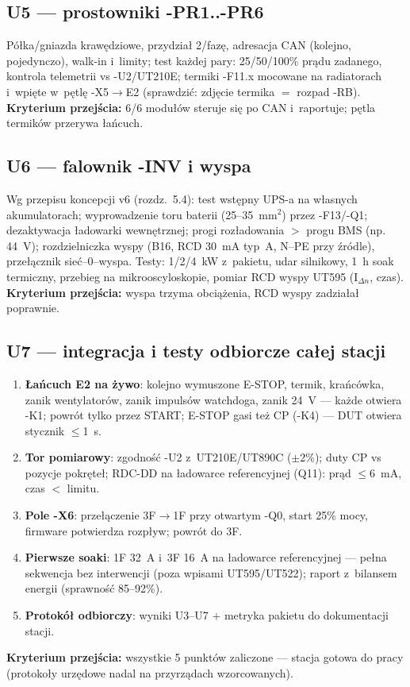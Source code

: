 \documentclass[11pt,a4paper]{article}
\newcommand{\krok}[1]{\textbf{\color{granat}Kryterium przejścia:} #1}
\begin{document}
\subsection{U5 --- prostowniki -PR1..-PR6}
Półka/gniazda krawędziowe, przydział 2/fazę, adresacja CAN (kolejno, pojedynczo), walk-in i~limity; test
każdej pary: 25/50/100\% prądu zadanego, kontrola telemetrii vs -U2/UT210E; termiki -F11.x mocowane na
radiatorach i~wpięte w~pętlę -X5$\to$E2 (sprawdzić: zdjęcie termika $=$ rozpad -RB). \krok{6/6 modułów
steruje się po CAN i~raportuje; pętla termików przerywa łańcuch.}

\subsection{U6 --- falownik -INV i wyspa}
Wg przepisu koncepcji v6 (rozdz.~5.4): test wstępny UPS-a na własnych akumulatorach; wyprowadzenie toru
baterii (25--35~mm$^2$) przez -F13/-Q1; dezaktywacja ładowarki wewnętrznej; progi rozładowania $>$ progu BMS
(np. 44~V); rozdzielniczka wyspy (B16, RCD 30~mA typ~A, N--PE przy źródle), przełącznik sieć--0--wyspa.
Testy: 1/2/4~kW z~pakietu, udar silnikowy, 1~h soak termiczny, przebieg na mikrooscyloskopie, pomiar RCD
wyspy UT595 (I$_{\Delta n}$, czas). \krok{wyspa trzyma obciążenia, RCD wyspy zadziałał poprawnie.}

\subsection{U7 --- integracja i testy odbiorcze całej stacji}
\begin{enumerate}
\item \textbf{Łańcuch E2 na żywo}: kolejno wymuszone E-STOP, termik, krańcówka, zanik wentylatorów, zanik
impulsów watchdoga, zanik 24~V --- każde otwiera -K1; powrót tylko przez START; E-STOP gasi też CP (-K4)
--- DUT otwiera stycznik $\le$1~s.
\item \textbf{Tor pomiarowy}: zgodność -U2 z~UT210E/UT890C ($\pm$2\%); duty CP vs pozycje pokręteł;
RDC-DD na ładowarce referencyjnej (Q11): prąd $\le$6~mA, czas $<$ limitu.
\item \textbf{Pole -X6}: przełączenie 3F$\to$1F przy otwartym -Q0, start 25\% mocy, firmware potwierdza
rozpływ; powrót do 3F.
\item \textbf{Pierwsze soaki}: 1F 32~A i~3F 16~A na ładowarce referencyjnej --- pełna sekwencja bez
interwencji (poza wpisami UT595/UT522); raport z~bilansem energii (sprawność 85--92\%).
\item \textbf{Protokół odbiorczy}: wyniki U3--U7 $+$ metryka pakietu do dokumentacji stacji.
\end{enumerate}
\krok{wszystkie 5 punktów zaliczone --- stacja gotowa do pracy (protokoły urzędowe nadal na przyrządach
wzorcowanych).}
\end{document}
